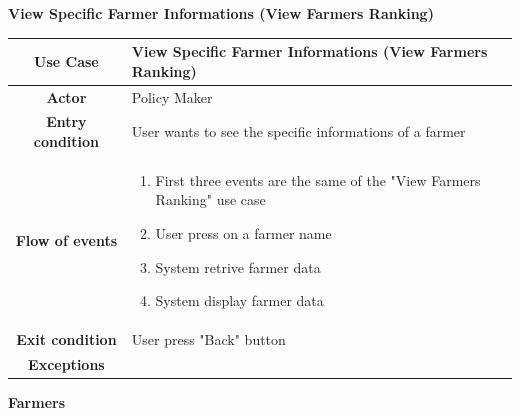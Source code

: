\documentclass[table, 12pt]{article}
\begin{document}
\begin{itemize}
            \begin{table}[H]
                \item[] \textbf{View Specific Farmer Informations (View Farmers Ranking)}
                \item[] 
                \centering
                \begin{tabular}{|c| m{}|}
                    \hline
                    \textbf{Use Case} & View Specific Farmer Informations (View Farmers Ranking)\\ \hline
                    \textbf{Actor} & Policy Maker\\ \hline
                    \textbf{Entry condition} & User wants to see the specific informations of a farmer\\  \hline
                    \textbf{Flow of events} & \begin{enumerate}
                                                \item First three events are the same of the "View Farmers Ranking" use case 
                                                \item User press on a farmer name
                                                \item System retrive farmer data 
                                                \item System display farmer data
                                            \end{enumerate}\\ \hline
                    \textbf{Exit condition} & User press "Back" button\\ \hline
                    \textbf{Exceptions} &  \\ \hline                    
                \end{tabular}
            \end{table}
            
            \newpage


            \item \textbf {Farmers}
            

\end{itemize}
\end{document}
